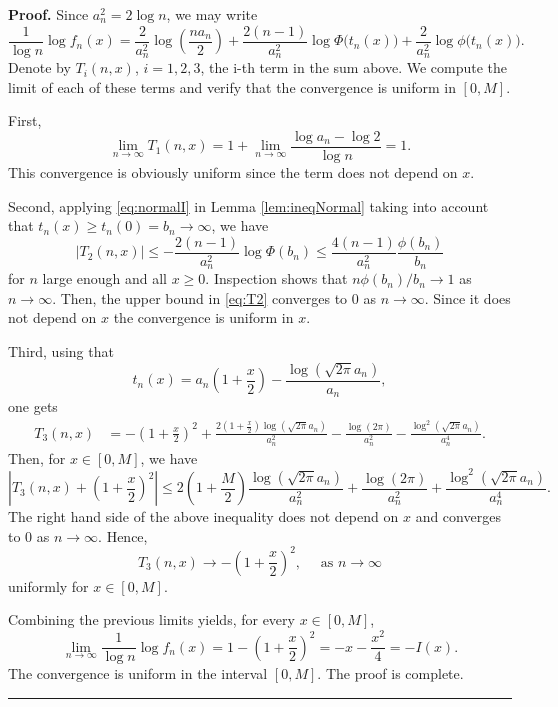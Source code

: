 \documentclass[12pt]{article}%
\newenvironment{proof}[1][Proof]{\textbf{#1.} }{\ \rule{0.5em}{0.5em}}
\begin{document}
\begin{proof}
Since $a_n^2=2\log n$, we may write
\[
\frac{1}{\log n}\log f_n(x)
=
\frac{2}{a_n^2}\log\!\left(\frac{n a_n}{2}\right)
+
\frac{2(n-1)}{a_n^2}\log\Phi\!\bigl(t_n(x)\bigr)
+
\frac{2}{a_n^2}\log\phi\!\bigl(t_n(x)\bigr).
\]
Denote by $T_i(n,x)$, $i=1,2,3$, the i-th term in the sum above. We compute the limit of each of these terms and verify that the convergence is  uniform in  $[0,M]$.

First,
\[
\lim_{n\to\infty}T_1(n,x)=
1+\lim_{n\to\infty}\frac{\log a_n-\log 2}{\log n}=1.
\]
This convergence is obviously uniform since the
term does not depend on $x$.

Second, applying \eqref{eq:normalI} in Lemma \ref{lem:ineqNormal} taking into account that $t_n(x)\ge t_n(0)=b_n\to \infty$, we have
\begin{equation}\label{eq:T2}
|T_2(n,x)|\le-\frac{2(n-1)}{a_n^2}\log\Phi(b_n)\le 
\frac{4(n-1)}{a_n^2}\frac{\phi(b_n)}{b_n}
\end{equation}
for $n$ large enough and all $x\ge 0$. 
Inspection shows that  $n\phi(b_n)/b_n\to 1$ as $n\to \infty$. Then, the upper bound in \eqref{eq:T2} converges to $0$ as $n\to\infty$. Since it does not depend on $x$ the convergence is  uniform in  $x$. 


Third, using that
\[
t_n(x)=a_n\left(1+\frac{x}{2}\right)-\frac{\log\left(\sqrt{2\pi}a_n\right)}{a_n},
\]
one gets
\begin{align*}
T_3(n,x)
&=
-\left(1+\frac{x}{2}\right)^2
+
\frac{2\left(1+\frac{x}{2}\right)\log(\sqrt{2\pi}a_n)}{a_n^2}  %
-\frac{\log(2\pi)}{a_n^2}
-
\frac{\log^2(\sqrt{2\pi}a_n)}{a_n^4}.
\end{align*}
Then, for $x\in[0,M]$, we have
\[
\left|T_3(n,x)+\left(1+\frac{x}{2}\right)^2\right|
\le 
2\left(1+\frac{M}{2}\right)\frac{\log(\sqrt{2\pi}a_n)}{a_n^2}+\frac{\log(2\pi)}{a_n^2}
+
\frac{\log^2(\sqrt{2\pi}a_n)}{a_n^4}.
\]
The right hand side of the above inequality does not depend on $x$ and converges to $0$ as $n\to\infty$. Hence,
\[
T_3(n,x)
\longrightarrow
-\left(1+\frac{x}{2}\right)^2,\quad\mbox{ as }
n\to\infty
\]
uniformly for $x\in[0,M]$.


Combining the previous limits yields, for every $x\in[0,M]$,
\[
\lim_{n\to\infty}\frac{1}{\log n}\log f_n(x)
=
1-\left(1+\frac{x}{2}\right)^2
=
-x-\frac{x^2}{4}=-I(x).
\]
The convergence is  uniform in  the interval $[0,M]$. The proof is complete.
\end{proof}
\end{document}
